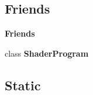 \subsection*{Friends}
\begin{Indent}\textbf{ Friends}\par
\begin{DoxyCompactItemize}
\item 
\mbox{\label{classrev_1_1_shader_aef20119bde6aff11ffd23f3ea2131b86}} 
class {\bfseries Shader\+Program}
\end{DoxyCompactItemize}
\end{Indent}
\subsection*{Static}
